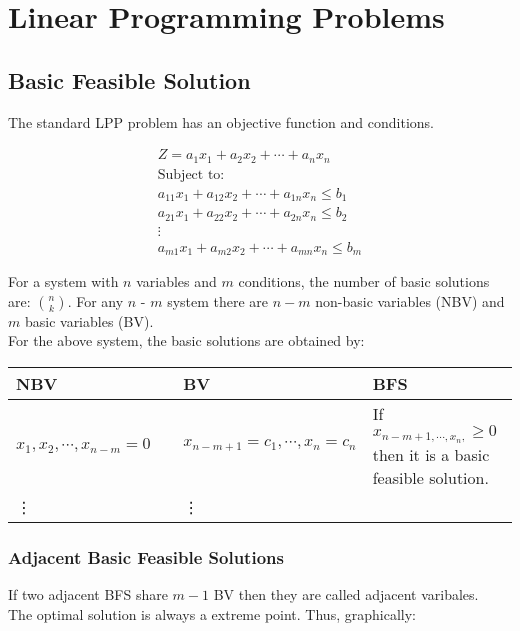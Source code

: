\chapter{Linear Programming Problems}
\section{Basic Feasible Solution}
The standard LPP problem has an objective function and conditions.
\begin{center}
	\begin{align*}
		Z = a_1 x_1 + a_2 x_2 + \cdots + a_n x_n\\
		\text{Subject to:}\\
		a_{11} x_{1} + a_{12} x_{2} + \cdots + a_{1n}x_n \leq b_1\\
		a_{21} x_{1} + a_{22} x_{2} + \cdots + a_{2n}x_n \leq b_2\\
		\vdots\\
		a_{m1} x_{1} + a_{m2} x_{2} + \cdots + a_{mn}x_n \leq b_m
	\end{align*}
\end{center}
For a system with $n$ variables and $m$ conditions, the number of basic solutions are: ${n\choose k}$.
For any $n$ - $m$ system there are $n-m$ non-basic variables (NBV) and $m$ basic variables (BV).\\
For the above system, the basic solutions are obtained by:\\
\begin{table}[ht]
	\centering
	\begin{tabular}{|p{0.35\linewidth} | p{0.35\linewidth}| p{0.3\linewidth}|}
		\hline
		NBV & BV & BFS\\
		\hline
		$x_1,x_2,\cdots,x_{n-m} = 0$ & $x_{n-m+1} = c_1, \cdots , x_n = c_n$ & If $x_{n-m+1, \cdots , x_n,} \geq 0$ then it is a basic feasible solution.\\
		\vdots & \vdots & \\
		\hline
	\end{tabular}
\end{table}

\subsection{Adjacent Basic Feasible Solutions}
If two adjacent BFS share $m-1$ BV then they are called adjacent varibales.\\
The optimal solution is always a extreme point. Thus, graphically:

